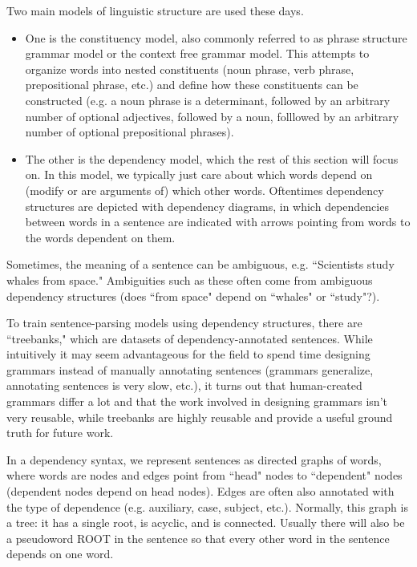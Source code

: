 Two main models of linguistic structure are used these days. 
\begin{itemize}
\item One is the constituency model, also commonly referred to as phrase structure grammar model or the context free grammar model. This attempts to organize words into nested constituents (noun phrase, verb phrase, prepositional phrase, etc.) and define how these constituents can be constructed (e.g. a noun phrase is a determinant, followed by an arbitrary number of optional adjectives, followed by a noun, folllowed by an arbitrary number of optional prepositional phrases).
\item The other is the dependency model, which the rest of this section will focus on. In this model, we typically just care about which words depend on (modify or are arguments of) which other words. Oftentimes dependency structures are depicted with dependency diagrams, in which dependencies between words in a sentence are indicated with arrows pointing from words to the words dependent on them.
\end{itemize}
Sometimes, the meaning of a sentence can be ambiguous, e.g. ``Scientists study whales from space." Ambiguities such as these often come from ambiguous dependency structures (does ``from space" depend on ``whales" or ``study"?).

To train sentence-parsing models using dependency structures, there are ``treebanks," which are datasets of dependency-annotated sentences. While intuitively it may seem advantageous for the field to spend time designing grammars instead of manually annotating sentences (grammars generalize, annotating sentences is very slow, etc.), it turns out that human-created grammars differ a lot and that the work involved in designing grammars isn't very reusable, while treebanks are highly reusable and provide a useful ground truth for future work.

In a dependency syntax, we represent sentences as directed graphs of words, where words are nodes and edges point from ``head" nodes to ``dependent" nodes (dependent nodes depend on head nodes). Edges are often also annotated with the type of dependence (e.g. auxiliary, case, subject, etc.). Normally, this graph is a tree: it has a single root, is acyclic, and is connected. Usually there will also be a pseudoword ROOT in the sentence so that every other word in the sentence depends on one word.

